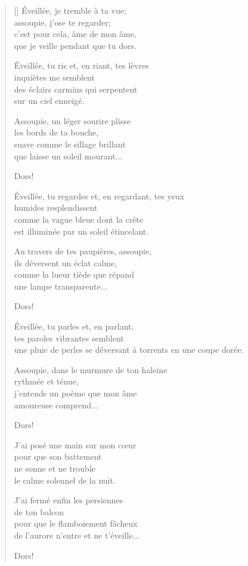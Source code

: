 \documentclass[a4paper,12pt]{book}
\begin{document}
\begin{verse}[\versewidth]
  Éveillée, je tremble à ta vue; \\
  assoupie, j'ose te regarder; \\
  c'est pour cela, âme de mon âme, \\
  que je veille pendant que tu dors.

  Éveillée, tu ris et, en riant, tes lèvres \\
  inquiètes me semblent \\
  des éclairs carmins qui serpentent \\
  sur un ciel enneigé.

  Assoupie, un léger sourire plisse \\
  les bords de ta bouche, \\
  suave comme le sillage brillant \\
  que laisse un soleil mourant...

  Dors!

  Éveillée, tu regardes et, en regardant, tes yeux \\
  humides resplendissent \\
  comme la vague bleue dont la crête \\
  est illuminée par un soleil étincelant.

  Au travers de tes paupières, assoupie, \\
  ils déversent un éclat calme, \\
  comme la lueur tiède que répand \\
  une lampe transparente...

  Dors!

  Éveillée, tu parles et, en parlant, \\
  tes paroles vibrantes semblent \\
  une pluie de perles se déversant à torrents
  en une coupe dorée.

  Assoupie, dans le murmure de ton haleine \\
  rythmée et ténue, \\
  j'entends un poème que mon âme \\
  amoureuse comprend...

  Dors!

  J'ai posé une main sur mon cœur \\
  pour que son battement \\
  ne sonne et ne trouble \\
  le calme solennel de la nuit.

  J'ai fermé enfin les persiennes \\
  de ton balcon \\
  pour que le flamboiement fâcheux \\
  de l'aurore n'entre et ne t'éveille...

  Dors!
\end{verse}
\end{document}

